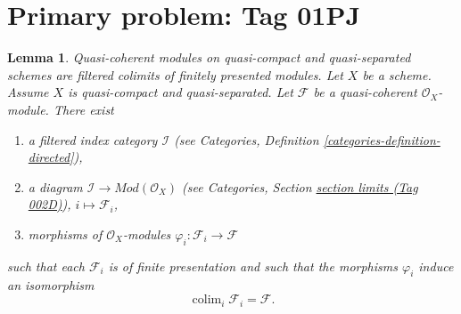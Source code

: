 \documentclass{amsart}
\newenvironment{slogan}{\comment}{\endcomment}
\theoremstyle{plain}
\newtheorem{lemma}[subsection]{Lemma}
\theoremstyle{definition}
\theoremstyle{remark}
\numberwithin{equation}{subsection}
\def\colim{\mathop{\mathrm{colim}}\nolimits}
\begin{document}
\section*{Primary problem: Tag 01PJ}
\begin{lemma}
\label{lemma-directed-colimit-diagram-finite-presentation}
\begin{slogan}
Quasi-coherent modules on quasi-compact and quasi-separated schemes
are filtered colimits of finitely presented modules.
\end{slogan}
Let $X$ be a scheme. Assume $X$ is quasi-compact and quasi-separated.
Let $\mathcal{F}$ be a quasi-coherent $\mathcal{O}_X$-module.
There exist
\begin{enumerate}
\item a filtered index category $\mathcal{I}$ (see
Categories, Definition \ref{categories-definition-directed}),
\item a diagram $\mathcal{I} \to \textit{Mod}(\mathcal{O}_X)$ (see
Categories, Section \href{https://stacks.math.columbia.edu/tag/002D}{section limits (Tag 002D)}),
$i \mapsto \mathcal{F}_i$,
\item morphisms of $\mathcal{O}_X$-modules
$\varphi_i : \mathcal{F}_i \to \mathcal{F}$
\end{enumerate}
such that each $\mathcal{F}_i$ is of finite presentation
and such that the morphisms $\varphi_i$ induce an isomorphism
$$
\colim_i \mathcal{F}_i
=
\mathcal{F}.
$$
\end{lemma}
\end{document}
